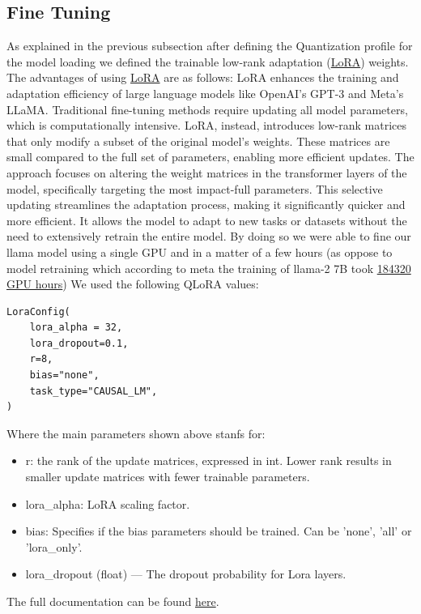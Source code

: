 \documentclass[11pt]{article}
\begin{document}
\subsection{Fine Tuning}
As explained in the previous subsection after defining the Quantization profile for the model loading we defined the trainable low-rank adaptation (\href{https://huggingface.co/docs/peft/main/en/conceptual_guides/lora}{LoRA}) weights. The advantages of using \href{https://huggingface.co/docs/peft/main/en/conceptual_guides/lora}{LoRA} are as follows:  
LoRA enhances the training and adaptation efficiency of large language models like OpenAI’s GPT-3 and Meta’s LLaMA. Traditional fine-tuning methods require updating all model parameters, which is computationally intensive. LoRA, instead, introduces low-rank matrices that only modify a subset of the original model's weights. These matrices are small compared to the full set of parameters, enabling more efficient updates.
The approach focuses on altering the weight matrices in the transformer layers of the model, specifically targeting the most impact-full parameters. This selective updating streamlines the adaptation process, making it significantly quicker and more efficient. It allows the model to adapt to new tasks or datasets without the need to extensively retrain the entire model.
By doing so we were able to fine our llama model using a single GPU and in a matter of a few hours (as oppose to model retraining which according to meta the training of llama-2 7B took \href{https://huggingface.co/meta-llama/Llama-2-7b-chat-hf}{184320 GPU hours})
We used the following QLoRA values:
\begin{verbatim}
LoraConfig(
    lora_alpha = 32,
    lora_dropout=0.1,
    r=8,
    bias="none",
    task_type="CAUSAL_LM",
)
\end{verbatim}
Where the main parameters shown above stanfs for:
\begin{itemize}
    \item r: the rank of the update matrices, expressed in int. Lower rank results in smaller update matrices with fewer trainable parameters.
    \item lora\_alpha: LoRA scaling factor.
    \item bias: Specifies if the bias parameters should be trained. Can be 'none', 'all' or 'lora\_only'.
    \item lora\_dropout (float) — The dropout probability for Lora layers.
\end{itemize}
The full documentation can be found  \href{https://huggingface.co/docs/peft/en/package_reference/lora}{here}.\\
\end{document}

